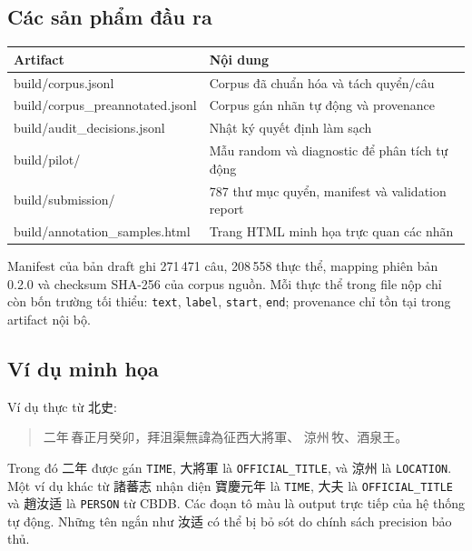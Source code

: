 \documentclass[11pt,a4paper]{article}
\newcommand{\han}[1]{{\hanfont #1}}
\begin{document}
\subsection{Các sản phẩm đầu ra}

\begin{table}[ht]
\centering
\small
\begin{tabularx}{\textwidth}{>{\ttfamily\raggedright\arraybackslash}p{} X}
\toprule
Artifact & Nội dung \\
\midrule
build/corpus.jsonl & Corpus đã chuẩn hóa và tách quyển/câu \\
build/corpus\_preannotated.jsonl & Corpus gán nhãn tự động và provenance \\
build/audit\_decisions.jsonl & Nhật ký quyết định làm sạch \\
build/pilot/ & Mẫu random và diagnostic để phân tích tự động \\
build/submission/ & 787 thư mục quyển, manifest và validation report \\
build/annotation\_samples.html & Trang HTML minh họa trực quan các nhãn \\
\bottomrule
\end{tabularx}
\end{table}

Manifest của bản draft ghi 271\,471 câu, 208\,558 thực thể, mapping phiên bản
0.2.0 và checksum SHA-256 của corpus nguồn. Mỗi thực thể trong file nộp chỉ còn
bốn trường tối thiểu: \texttt{text}, \texttt{label}, \texttt{start},
\texttt{end}; provenance chỉ tồn tại trong artifact nội bộ.

\subsection{Ví dụ minh họa}

Ví dụ thực từ \han{北史}:

\begin{quote}
\han{\colorbox{timecolor}{二年}\,春正月癸卯，拜沮渠無諱為征西\colorbox{titlecolor}{大將軍}、
\colorbox{locationcolor}{涼州}\,牧、酒泉王。}
\end{quote}

Trong đó \han{二年} được gán \texttt{TIME}, \han{大將軍} là
\texttt{OFFICIAL\_TITLE}, và \han{涼州} là \texttt{LOCATION}. Một ví dụ khác
từ \han{諸蕃志} nhận diện \han{寶慶元年} là \texttt{TIME}, \han{大夫} là
\texttt{OFFICIAL\_TITLE} và \han{趙汝适} là \texttt{PERSON} từ CBDB. Các đoạn
tô màu là output trực tiếp của hệ thống tự động. Những tên ngắn như
\han{汝适} có thể bị bỏ sót do chính sách precision bảo thủ.
\end{document}
